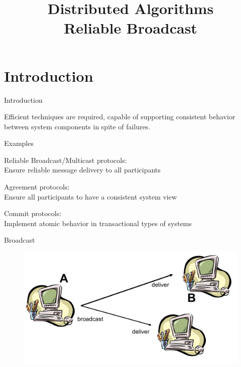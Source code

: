 
\title[DS - Reliable Broadcast]{\textbf{Distributed Algorithms}\\Reliable Broadcast}





\FrameTitle
\FrameContent

\section{Introduction}

\begin{frame}{Introduction}

Efficient techniques are required, capable of supporting consistent behavior 
between system components in spite of failures.

\bigskip
\begin{block}{Examples}
\BIL
\item  \alert{Reliable Broadcast/Multicast protocols}:\\
Ensure reliable message delivery to all participants 
\item Agreement protocols:\\
Ensure all participants to have a consistent system view 
\item Commit protocols:\\
Implement atomic behavior in transactional types of systems
\EIL
\end{block}

\end{frame}

\begin{frame}{Broadcast}
	
\begin{figure}
\includegraphics[width=\textwidth]{figs/04/rb-example}
\end{figure}

\end{frame}

